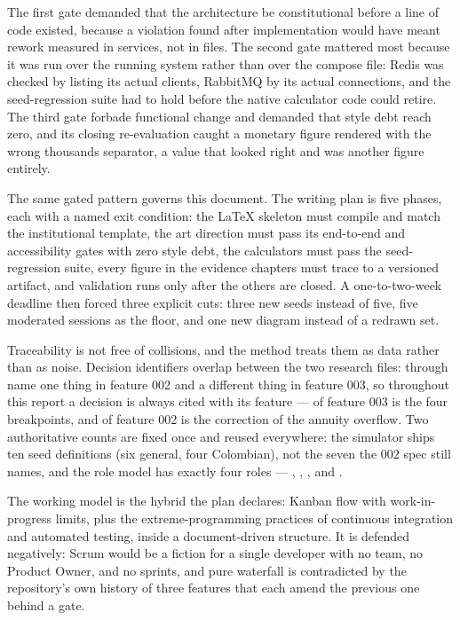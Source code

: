 The first gate demanded that the architecture be constitutional before a line
of code existed, because a violation found after implementation would have
meant rework measured in services, not in files. The second gate mattered most
because it was run over the running system rather than over the compose file:
Redis was checked by listing its actual clients, RabbitMQ by its actual
connections, and the seed-regression suite had to hold before the native
calculator code could retire. The third gate forbade functional change and
demanded that style debt reach zero, and its closing re-evaluation caught a
monetary figure rendered with the wrong thousands separator, a value that
looked right and was another figure entirely.

The same gated pattern governs this document. The writing plan is five phases,
each with a named exit condition: the LaTeX skeleton must compile and match
the institutional template, the art direction must pass its end-to-end and
accessibility gates with zero style debt, the calculators must pass the
seed-regression suite, every figure in the evidence chapters must trace to a
versioned artifact, and validation runs only after the others are closed. A
one-to-two-week deadline then forced three explicit cuts: three new seeds
instead of five, five moderated sessions as the floor, and one new diagram
instead of a redrawn set.

Traceability is not free of collisions, and the method treats them as data
rather than as noise. Decision identifiers overlap between the two research
files:  through  name one thing in feature 002 and a
different thing in feature 003, so throughout this report a decision is always
cited with its feature ---  of feature 003 is the four breakpoints,
and  of feature 002 is the correction of the annuity overflow. Two
authoritative counts are fixed once and reused everywhere: the simulator ships
ten seed definitions (six general, four Colombian), not the seven the 002 spec
still names, and the role model has exactly four roles --- ,
, , and .

The working model is the hybrid the plan declares: Kanban flow with
work-in-progress limits, plus the extreme-programming practices of continuous
integration and automated testing, inside a document-driven structure. It is
defended negatively: Scrum would be a fiction for a single developer with no
team, no Product Owner, and no sprints, and pure waterfall is contradicted by
the repository's own history of three features that each amend the previous one
behind a gate.

